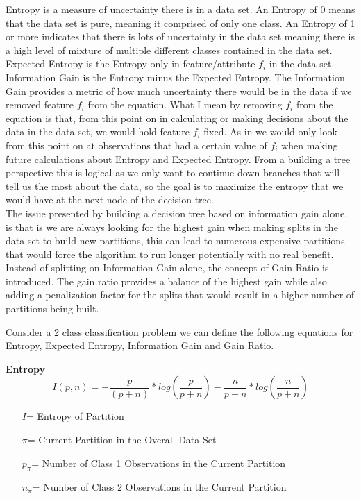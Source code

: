 \documentclass[twoside,11pt]{article}
\begin{document}
\hspace*{5mm}Entropy is a measure of uncertainty there is in a data set. An Entropy of 0 means that the data set is pure, meaning it comprised of only one class. An Entropy of 1 or more indicates that there is lots of uncertainty in the data set meaning there is a high level of mixture of multiple different classes contained in the data set.\newline
Expected Entropy is the Entropy only in feature/attribute $f_i$ in the data set.\newline
Information Gain is the Entropy minus the Expected Entropy. The Information Gain provides a metric of how much uncertainty there would be in the data if we removed feature $f_i$ from the equation. What I mean by removing $f_i$ from the equation is that, from this point on in calculating or making decisions about the data in the data set, we would hold feature $f_i$ fixed. As in we would only look from this point on at observations that had a certain value of $f_i$ when making future calculations about Entropy and Expected Entropy. From a building a tree perspective this is logical as we only want to continue down branches that will tell us the most about the data, so the goal is to maximize the entropy that we would have at the next node of the decision tree.\\

\hspace*{5mm}The issue presented by building a decision tree based on information gain alone, is that is we are always looking for the highest gain when making splits in the data set to build new partitions, this can lead to numerous expensive partitions that would force the algorithm to run longer potentially with no real benefit. Instead of splitting on Information Gain alone, the concept of Gain Ratio is introduced. The gain ratio provides a balance of the highest gain while also adding a penalization factor for the splits that would result in a higher number of partitions being built.
\newpage

Consider a 2 class classification problem we can define the following equations for Entropy, Expected Entropy, Information Gain and Gain Ratio.\newline

\textbf{Entropy}
\begin{equation}
I(p,n) = -\frac{p}{(p+n)} * log(\frac{p}{p+n}) - \frac{n}{p+n} * log(\frac{n}{p+n})
\end{equation}
\begin{itemize}
	\item[$I$=] Entropy of Partition
	\item[$\pi$=] Current Partition in the Overall Data Set
	\item[$p_\pi$=] Number of Class 1 Observations in the Current Partition
	\item[$n_\pi$=] Number of Class 2 Observations in the Current Partition
\end{itemize}
\newline
\end{document}
